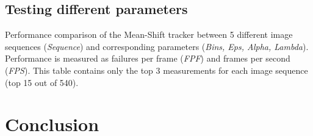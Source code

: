 \documentclass[runningheads]{llncs}
\begin{document}
\subsection{Testing different parameters}



\begin{table}
\centering
{}
\caption{Performance comparison of the Mean-Shift tracker between 5 different image sequences (\textit{Sequence}) and corresponding parameters (\textit{Bins, Eps, Alpha, Lambda}). Performance is measured as failures per frame (\textit{FPF}) and frames per second (\textit{FPS}). This table contains only the top 3 measurements for each image sequence (top 15 out of 540).}
\label{tbl_ms_tracker_performance}
\end{table}

\section{Conclusion}
\end{document}
